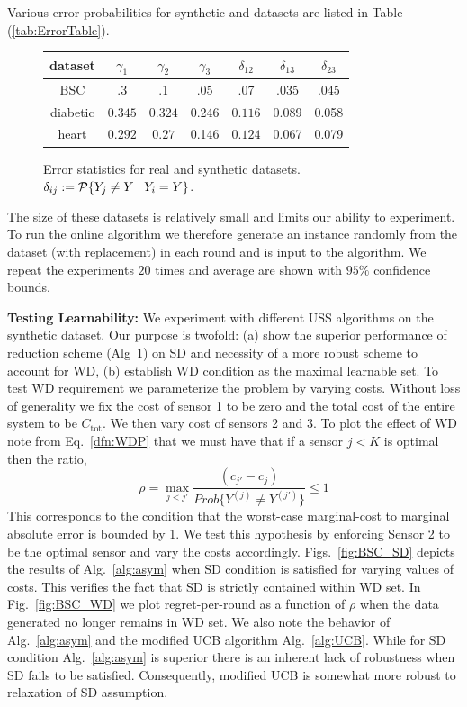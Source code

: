 %
Various error probabilities for synthetic and datasets are listed in Table (\ref{tab:ErrorTable}).  
	\begin{figure}[!h]
		\small
		\begin{tabular}[c]{c|c|c|c|c|c|c } 
			\label{tab:ErrorTable}
			dataset & $\gamma_1$ & $\gamma_2$ & $\gamma_3$ &$\delta_{12}$ & $\delta_{13}$ & $\delta_{23}$ \\ \hline 
			BSC & .3 & .1 & .05 & .07 & .035 & .045\\  \hline
			diabetic & $0.345 $ & $ 0.324$ & 0.246 & $ 0.116 $ & 0.089 &0.058\\  \hline
			heart & $0.292$ & $0.27$ & 0.146 & $0.124$ & 0.067 & 0.079\\  \hline
		\end{tabular}
		\caption{Error statistics for real and synthetic datasets. $\delta_{ij}:=\P\{Y_j\neq Y \mid Y_i = Y\}$.}
\label{tab:error_stats}
	\end{figure}
The size of these datasets is relatively small and limits our ability to experiment. To run the online algorithm we therefore generate an instance randomly from the dataset (with replacement) in each round and is input to the  algorithm. We repeat the experiments $20$ times and average are shown with $95\%$ confidence bounds.

\noindent
{\bf Testing Learnability:}
We experiment with different USS algorithms on the synthetic dataset. Our purpose is twofold: (a) show the superior performance of reduction scheme (Alg~1) on SD and necessity of a more robust scheme to account for WD, (b) establish WD condition as the maximal learnable set. To test WD requirement we parameterize the problem by varying costs. Without loss of generality we fix the cost of sensor 1 to be zero and the total cost of the entire system to be $C_{\mbox{tot}}$. We then vary cost of sensors 2 and 3. To plot the effect of WD note from Eq.~\ref{dfn:WDP} that we must have that if a sensor $j <K$ is optimal then the ratio,
$$
\rho = \max_{j < j'} \frac{(c_{j'} - c_j)}{Prob\{Y^{(j)} \neq Y^{(j')}\}} \leq 1
$$
This corresponds to the condition that the worst-case marginal-cost to marginal absolute error is bounded by 1.
We test this hypothesis by enforcing Sensor 2 to be the optimal sensor and vary the costs accordingly. Figs.~\ref{fig:BSC_SD} depicts the results of Alg.~\ref{alg:asym} when SD condition is satisfied for varying values of costs. This verifies the fact that SD is strictly contained within WD set. In Fig.~\ref{fig:BSC_WD} we plot regret-per-round as a function of $\rho$ when the data generated no longer remains in WD set. We also note the behavior of Alg.~\ref{alg:asym} and the modified UCB algorithm Alg.~\ref{alg:UCB}. While for SD condition Alg.~\ref{alg:asym} is superior there is an inherent lack of robustness when SD fails to be satisfied. Consequently, modified UCB is somewhat more robust to relaxation of SD assumption.

